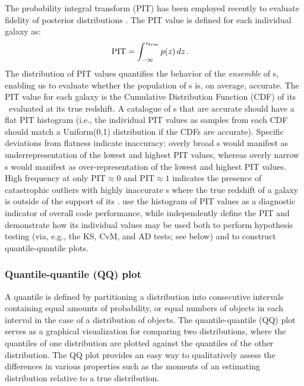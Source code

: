 The probability integral transform (PIT) has been employed recently to evaluate fidelity of posterior distributions \citep[e.~g.~][]{Bordoloi:10,Polsterer:16,Tanaka:17}.  The PIT value is defined for each individual galaxy as:
\begin{align}
\label{eq:pit}
\mathrm{PIT} &= \int_{-\infty}^{z_{\rm true}}p(z)\, dz \,.
\end{align}
The distribution of PIT values quantifies the behavior of the {\it ensemble} of \pzpdf s, enabling us to evaluate whether the population of \pzpdf s is, on average, accurate.
The PIT value for each galaxy is the Cumulative Distribution Function (CDF) of its \pzpdf\ evaluated at its true redshift.
A catalogue of \pzpdf s that are accurate should have a flat PIT histogram (i.e., the individual PIT values as samples from each CDF should match a Uniform(0,1) distribution if the CDFs are accurate).
Specific deviations from flatness indicate inaccuracy: overly broad \pzpdf s would manifest as underrepresentation of the lowest and highest PIT values, whereas overly narrow \pzpdf s would manifest as over-representation of the lowest and highest PIT values.
High frequency at only $\mathrm{PIT}\approx0$ and $\mathrm{PIT}\approx1$ indicates the presence of catastrophic outliers with highly inaccurate \pzpdf s where the true redshift of a galaxy is outside of the support of its \pzpdf.
\citet{Tanaka:17} use the histogram of PIT values as a diagnostic indicator of overall code performance, while \citet{Freeman:17} independently define the PIT and demonstrate how its individual values may be used both to perform hypothesis testing (via, e.g., the KS, CvM, and AD tests; see below) and to construct quantile-quantile plots.

\subsubsection{Quantile-quantile (QQ) plot}
\label{sec:qq}

A quantile is defined by partitioning a distribution into consecutive intervals containing equal amounts of probability, or equal numbers of objects in each interval in the case of a distribution of objects.
The quantile-quantile (QQ) plot serves as a graphical visualization for comparing two distributions, where the quantiles of one distribution are plotted against the quantiles of the other distribution.
The QQ plot provides an easy way to qualitatively assess the differences in various properties such as the moments of an estimating distribution relative to a true distribution.

